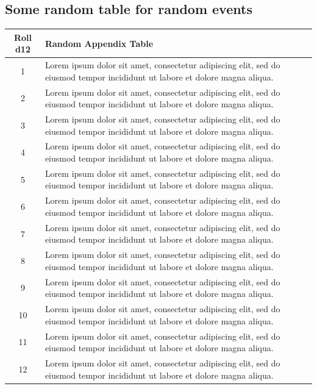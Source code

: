 \subsection{\centering Some random table for random events}
\begin{table}[!htbp]
	\centering
	\begin{tabular}{|c|p{14.5cm}|}
		\hline
		\textbf{Roll d12} & \textbf{Random Appendix Table}                                                                                              \\
		\hline
		\hline
		1                 & Lorem ipsum dolor sit amet, consectetur adipiscing elit, sed do eiusmod tempor incididunt ut labore et dolore magna aliqua. \\
		2                 & Lorem ipsum dolor sit amet, consectetur adipiscing elit, sed do eiusmod tempor incididunt ut labore et dolore magna aliqua. \\
		3                 & Lorem ipsum dolor sit amet, consectetur adipiscing elit, sed do eiusmod tempor incididunt ut labore et dolore magna aliqua. \\
		4                 & Lorem ipsum dolor sit amet, consectetur adipiscing elit, sed do eiusmod tempor incididunt ut labore et dolore magna aliqua. \\
		5                 & Lorem ipsum dolor sit amet, consectetur adipiscing elit, sed do eiusmod tempor incididunt ut labore et dolore magna aliqua. \\
		6                 & Lorem ipsum dolor sit amet, consectetur adipiscing elit, sed do eiusmod tempor incididunt ut labore et dolore magna aliqua. \\
		7                 & Lorem ipsum dolor sit amet, consectetur adipiscing elit, sed do eiusmod tempor incididunt ut labore et dolore magna aliqua. \\
		8                 & Lorem ipsum dolor sit amet, consectetur adipiscing elit, sed do eiusmod tempor incididunt ut labore et dolore magna aliqua. \\
		9                 & Lorem ipsum dolor sit amet, consectetur adipiscing elit, sed do eiusmod tempor incididunt ut labore et dolore magna aliqua. \\
		10                & Lorem ipsum dolor sit amet, consectetur adipiscing elit, sed do eiusmod tempor incididunt ut labore et dolore magna aliqua. \\
		11                & Lorem ipsum dolor sit amet, consectetur adipiscing elit, sed do eiusmod tempor incididunt ut labore et dolore magna aliqua. \\
		12                & Lorem ipsum dolor sit amet, consectetur adipiscing elit, sed do eiusmod tempor incididunt ut labore et dolore magna aliqua. \\
		\hline
	\end{tabular}
	\label{tab:monster-descriptions}
\end{table}


